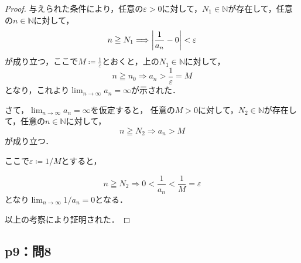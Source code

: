 \documentclass[uplatex,dvipdfmx,a4paper,10pt,fleqn]{jsarticle}
\newenvironment{tleftbar}{\begin{tbleftline}\setlength{\parindent}{1zw}}{\end{tbleftline}}
\begin{document}
    \begin{tleftbar}
        \begin{proof}
            与えられた条件により，任意の$\varepsilon>0$に対して，$N_1 \in \mathbb{N}$が存在して，任意の$n \in \mathbb{N}$に対して，
    \[
        n \geqq N_1 \Longrightarrow \abs{\frac{1}{a_n}-0}<\varepsilon
    \]
    が成り立つ，ここで$M \coloneqq \frac{1}{\varepsilon}$とおくと，上の$N_1 \in \mathbb{N}$に対して，
    \[
        n \geqq n_0 \Longrightarrow a_n  >\frac{1}{\varepsilon}=M
    \]
    となり，これより$\lim_{n \to \infty} a_n=\infty$が示された．

    さて，$\lim_{n \to \infty} a_n = \infty$を仮定すると，
        任意の$M>0$に対して，$N_2 \in \mathbb{N}$が存在して，任意の$n \in \mathbb{N}$に対して，
        \[
            n \geqq N_2 \Longrightarrow a_n > M
        \]
        が成り立つ．

        ここで$\varepsilon \coloneqq  1/M$とすると，

        \[
            n \geqq N_2 \Longrightarrow 0< \frac{1}{a_n} < \frac{1}{M}= \varepsilon 
        \]
        となり$\lim_{n \to \infty} 1/a_n = 0$となる．
        
        以上の考察により証明された．
        \end{proof}
        \end{tleftbar}


    \subsection*{p9：問8}
\end{document}
